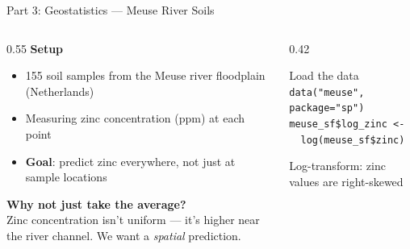 \documentclass[aspectratio=169, 12pt]{beamer}
\begin{document}
\begin{frame}{Part 3: Geostatistics --- Meuse River Soils}
  \begin{columns}[t]
    \begin{column}{0.55\textwidth}
      \textbf{Setup}
      \begin{itemize}
        \item 155 soil samples from the Meuse river floodplain (Netherlands)
        \item Measuring zinc concentration (ppm) at each point
        \item \textbf{Goal}: predict zinc everywhere, not just at sample locations
      \end{itemize}
      \vspace{0.5em}
      \textbf{Why not just take the average?}\\
      Zinc concentration isn't uniform --- it's higher near the river channel. We want a \emph{spatial} prediction.
    \end{column}
    \begin{column}{0.42\textwidth}
      \begin{exampleblock}{Load the data}
        \texttt{data("meuse", package="sp")}\\[4pt]
        \texttt{meuse\_sf\$log\_zinc <-}\\
        \texttt{\ \ log(meuse\_sf\$zinc)}
        \vspace{0.3em}

        \small Log-transform: zinc values are right-skewed
      \end{exampleblock}
    \end{column}
  \end{columns}
\end{frame}

\end{document}
